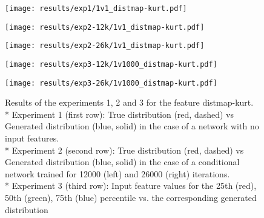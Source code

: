 \begin{figure}[h!]
	\begin{minipage}{0.5\linewidth}
		\texttt{[image: results/exp1/1v1\_distmap-kurt.pdf]}
	\end{minipage}
	
	\begin{minipage}{0.5\linewidth}
		\texttt{[image: results/exp2-12k/1v1\_distmap-kurt.pdf]}
	\end{minipage}
	\begin{minipage}{0.5\linewidth}
		\texttt{[image: results/exp2-26k/1v1\_distmap-kurt.pdf]}
	\end{minipage}
	
	\begin{minipage}{0.5\linewidth}
		\texttt{[image: results/exp3-12k/1v1000\_distmap-kurt.pdf]}
	\end{minipage}
	\begin{minipage}{0.5\linewidth}
		\texttt{[image: results/exp3-26k/1v1000\_distmap-kurt.pdf]}
	\end{minipage}
	\caption[ Results: Input feature distmap-kurt]{ Results of the experiments 1, 2 and 3 for the feature distmap-kurt. \\* Experiment 1 (first row): True distribution (red, dashed) vs Generated distribution (blue, solid) in the case of a network with no input features. \\* Experiment 2 (second row): True distribution (red, dashed) vs Generated distribution (blue, solid) in the case of a conditional network trained for 12000 (left) and 26000 (right) iterations. \\* Experiment 3 (third row): Input feature values for the 25th (red), 50th (green), 75th (blue) percentile vs. the corresponding generated distribution}
	\label{fig:results_distmap-kurt}
\end{figure}
